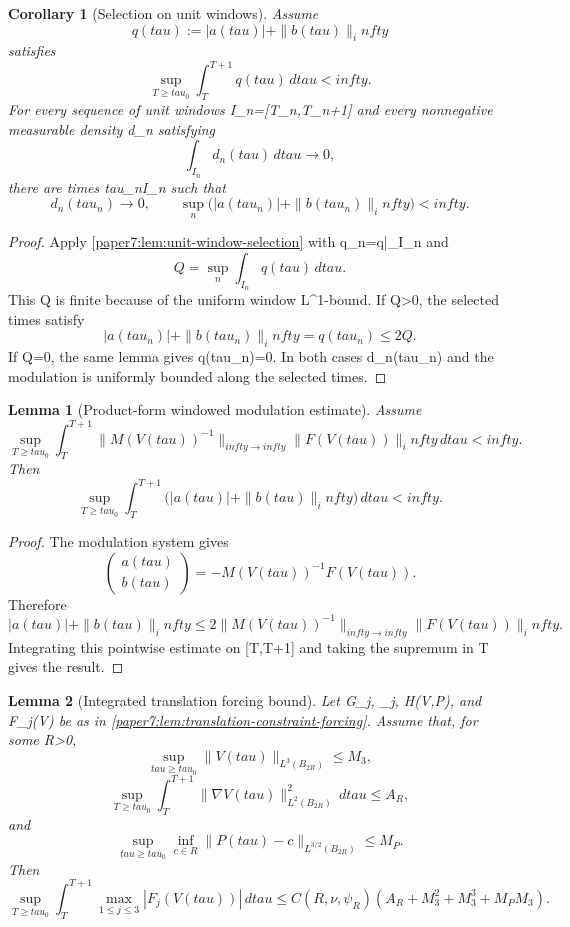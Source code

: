 \documentclass[11pt]{amsart}
\def\({}%
\def\){}%
\def\mathbb#1{#1}%
\def\tau{tau}%
\def\infty{infty}%
\theoremstyle{plain}
\newtheorem{lemma}[lemma]{Lemma}
\newtheorem{corollary}[corollary]{Corollary}
\theoremstyle{definition}
\theoremstyle{remark}
\begin{document}
\begin{corollary}[Selection on unit windows]
\label{paper7:cor:unit-window-selection}
Assume
\[
  q(\tau):=|a(\tau)|+\|b(\tau)\|_\infty
\]
satisfies
\[
  \sup_{T\ge\tau_0}\int_T^{T+1}q(\tau)\,d\tau<\infty .
\]
For every sequence of unit windows \(I_n=[T_n,T_n+1]\) and every nonnegative
measurable density \(d_n\) satisfying
\[
  \int_{I_n}d_n(\tau)\,d\tau\to0,
\]
there are times \(\tau_n\in I_n\) such that
\[
  d_n(\tau_n)\to0,\qquad
  \sup_n\bigl(|a(\tau_n)|+\|b(\tau_n)\|_\infty\bigr)<\infty .
\]
\end{corollary}

\begin{proof}
Apply \cref{paper7:lem:unit-window-selection} with \(q_n=q|_{I_n}\) and
\[
  Q=\sup_n\int_{I_n}q(\tau)\,d\tau .
\]
This \(Q\) is finite because of the uniform window \(L^1\)-bound.  If
\(Q>0\), the selected times satisfy
\[
  |a(\tau_n)|+\|b(\tau_n)\|_\infty=q(\tau_n)\le2Q.
\]
If \(Q=0\), the same lemma gives \(q(\tau_n)=0\).  In both cases
\(d_n(\tau_n)\) and the modulation is uniformly bounded along the
selected times.
\end{proof}

\begin{lemma}[Product-form windowed modulation estimate]
\label{paper7:lem:product-form-window-modulation}
Assume
\[
  \sup_{T\ge\tau_0}
  \int_T^{T+1}
  \|M(V(\tau))^{-1}\|_{\infty\to\infty}
  \|F(V(\tau))\|_\infty\,d\tau<\infty.
\]
Then
\[
  \sup_{T\ge\tau_0}
  \int_T^{T+1}\bigl(|a(\tau)|+\|b(\tau)\|_\infty\bigr)\,d\tau<\infty .
\]
\end{lemma}

\begin{proof}
The modulation system gives
\[
  \begin{pmatrix}a(\tau)\\ b(\tau)\end{pmatrix}
  =
  -M(V(\tau))^{-1}F(V(\tau)).
\]
Therefore
\[
  |a(\tau)|+\|b(\tau)\|_\infty
  \le
  2\|M(V(\tau))^{-1}\|_{\infty\to\infty}
  \|F(V(\tau))\|_\infty.
\]
Integrating this pointwise estimate on \([T,T+1]\) and taking the supremum in
\(T\) gives the result.
\end{proof}

\begin{lemma}[Integrated translation forcing bound]
\label{paper7:lem:window-translation-forcing}
Let \(G_j\), \(\Phi_j\), \(H(V,P)\), and \(F_j(V)\) be as in
\cref{paper7:lem:translation-constraint-forcing}.  Assume that, for some
\(R>0\),
\[
  \sup_{\tau\ge\tau_0}\|V(\tau)\|_{L^3(B_{2R})}\le M_3,
\]
\[
  \sup_{T\ge\tau_0}
  \int_T^{T+1}\|\nabla V(\tau)\|_{L^2(B_{2R})}^2\,d\tau
  \le A_R,
\]
and
\[
  \sup_{\tau\ge\tau_0}\inf_{c\in\mathbb R}
  \|P(\tau)-c\|_{L^{3/2}(B_{2R})}\le M_P.
\]
Then
\[
  \sup_{T\ge\tau_0}
  \int_T^{T+1}\max_{1\le j\le3}|F_j(V(\tau))|\,d\tau
  \le
  C(R,\nu,\psi_R)(A_R+M_3^2+M_3^3+M_PM_3).
\]
\end{lemma}
\end{document}
